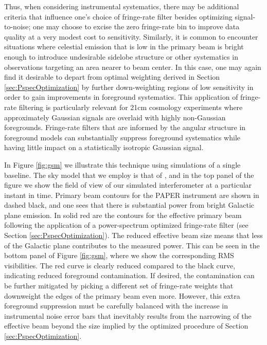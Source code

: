 \documentclass[twocolumn,apj,numberedappendix]{emulateapj}
\begin{document}
Thus, when considering instrumental systematics, there may be additional criteria that influence one's
choice of fringe-rate filter besides optimizing signal-to-noise; one may choose to excise the zero fringe-rate
bin to improve data quality at a very modest cost to sensitivity.  Similarly, it is common to encounter situations
where celestial emission that is low in the primary beam is bright enough to introduce undesirable 
sidelobe structure or other systematics in observations targeting an area nearer to beam center.  In this case,
one may again find it desirable to depart from optimal weighting derived in Section \ref{sec:PspecOptimization}
by further down-weighting regions of low sensitivity in order to gain improvements in foreground systematics.
This application of fringe-rate filtering is particularly relevant for 21cm cosmology experiments where approximately
Gaussian signals are overlaid with highly non-Gaussian foregrounds.  Fringe-rate filters that are informed by 
the angular structure in foreground models can substantially suppress foreground systematics while having little
impact on a statistically isotropic Gaussian signal.

In Figure \ref{fig:gsm} we illustrate this technique using simulations of a single baseline. The sky model
that we employ is that of \citet{deoliveiracosta_et_al2008}, and in the top panel of the figure we show
the field of view of our simulated interferometer at a particular instant in time. Primary beam contours
for the PAPER instrument are shown in dashed black, and one sees that there is substantial power from
bright Galactic plane emission. In solid red are the contours for the effective primary beam following
the application of a power-spectrum optimized fringe-rate filter (see Section \ref{sec:PspecOptimization}).
The reduced effective beam size means that less of the Galactic plane contributes to the measured
power. This can be seen in the bottom panel of Figure \ref{fig:gsm}, where we show the corresponding
RMS visibilities. The red curve is clearly reduced compared to the black curve, indicating
reduced foreground contamination. If desired, the contamination can be further mitigated by picking
a different set of fringe-rate weights that downweight the edges of the primary beam even more. However,
this extra foreground suppression must be carefully balanced with the increase in instrumental noise error
bars that inevitably results from the narrowing of the effective beam beyond the size implied by the optimized procedure of
Section \ref{sec:PspecOptimization}.
\end{document}
